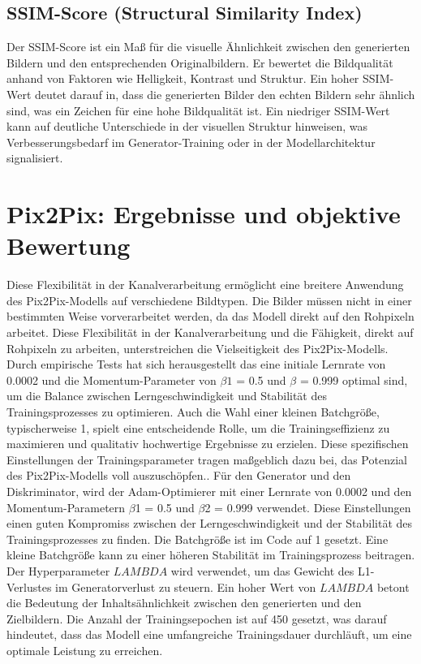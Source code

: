 \subsection{SSIM-Score (Structural Similarity Index)}
Der SSIM-Score ist ein Maß für die visuelle Ähnlichkeit zwischen den generierten Bildern und den entsprechenden Originalbildern. Er bewertet die Bildqualität anhand von Faktoren wie Helligkeit, Kontrast und Struktur. Ein hoher SSIM-Wert deutet darauf in, dass die generierten Bilder den echten Bildern sehr ähnlich sind, was ein Zeichen für eine hohe Bildqualität ist. Ein niedriger SSIM-Wert kann auf deutliche Unterschiede in der visuellen Struktur hinweisen, was Verbesserungsbedarf im Generator-Training oder in der Modellarchitektur signalisiert.

\section{Pix2Pix: Ergebnisse und objektive Bewertung}
 Diese Flexibilität in der Kanalverarbeitung ermöglicht eine breitere Anwendung des Pix2Pix-Modells auf verschiedene Bildtypen. Die Bilder müssen nicht in einer bestimmten Weise vorverarbeitet werden, da das Modell direkt auf den Rohpixeln arbeitet. Diese Flexibilität in der Kanalverarbeitung und die Fähigkeit, direkt auf Rohpixeln zu arbeiten, unterstreichen die Vielseitigkeit des Pix2Pix-Modells.
  Durch empirische Tests hat sich herausgestellt das eine initiale Lernrate von 0.0002 und die Momentum-Parameter von $\beta1$ = 0.5 und $\beta$ = 0.999 optimal sind, um die Balance zwischen Lerngeschwindigkeit und Stabilität des Trainingsprozesses zu optimieren. Auch die Wahl einer kleinen Batchgröße, typischerweise 1, spielt eine entscheidende Rolle, um die Trainingseffizienz zu maximieren und qualitativ hochwertige Ergebnisse zu erzielen. Diese spezifischen Einstellungen der Trainingsparameter tragen maßgeblich dazu bei, das Potenzial des Pix2Pix-Modells voll auszuschöpfen.\cite{PhillipIsola.}.\newline
  Für den Generator und den Diskriminator, wird der Adam-Optimierer mit einer Lernrate von 0.0002 und den Momentum-Parametern $\beta$1 = 0.5 und $\beta$2 = 0.999 verwendet. Diese Einstellungen einen guten Kompromiss zwischen der Lerngeschwindigkeit und der Stabilität des Trainingsprozesses zu finden. Die Batchgröße ist im Code auf 1 gesetzt. Eine kleine Batchgröße kann zu einer höheren Stabilität im Trainingsprozess beitragen. Der Hyperparameter $LAMBDA$ wird verwendet, um das Gewicht des L1-Verlustes im Generatorverlust zu steuern. Ein hoher Wert von $LAMBDA$ betont die Bedeutung der Inhaltsähnlichkeit zwischen den generierten und den Zielbildern. Die Anzahl der Trainingsepochen ist auf 450 gesetzt, was darauf hindeutet, dass das Modell eine umfangreiche Trainingsdauer durchläuft, um eine optimale Leistung zu erreichen.
